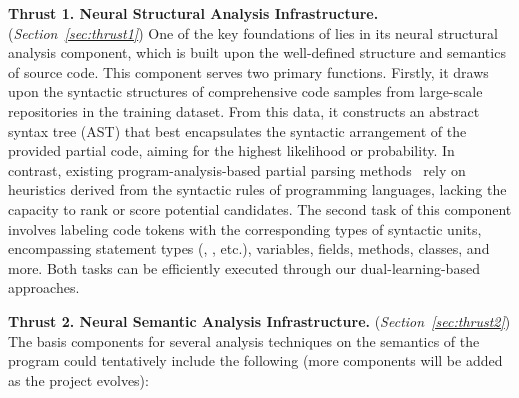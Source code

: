 \noindent \textbf{Thrust 1. Neural Structural Analysis Infrastructure.} ({\em Section~\ref{sec:thrust1}})
One of the key foundations of {\tool} lies in its neural structural analysis component, which is built upon the well-defined structure and semantics of source code. This component serves two primary functions. Firstly, it draws upon the syntactic structures of comprehensive code samples from large-scale repositories in the training dataset. From this data, it constructs an abstract syntax tree (AST) that best encapsulates the syntactic arrangement of the provided partial code, aiming for the highest likelihood or probability. In contrast, existing program-analysis-based partial parsing methods~\cite{ppa08} rely on heuristics derived from the syntactic rules of programming languages, lacking the capacity to rank or score potential candidates. The second task of this component involves labeling code tokens with the corresponding types of syntactic units, encompassing statement types (, , etc.), variables, fields, methods, classes, and more. Both tasks can be efficiently executed through our dual-learning-based approaches.

  
\vspace{3pt}
\noindent \textbf{Thrust 2. Neural Semantic Analysis Infrastructure.}
({\em Section~\ref{sec:thrust2}}) The basis components for several
analysis techniques on the semantics of the program could tentatively
include the following (more components will be added as the project
evolves):

